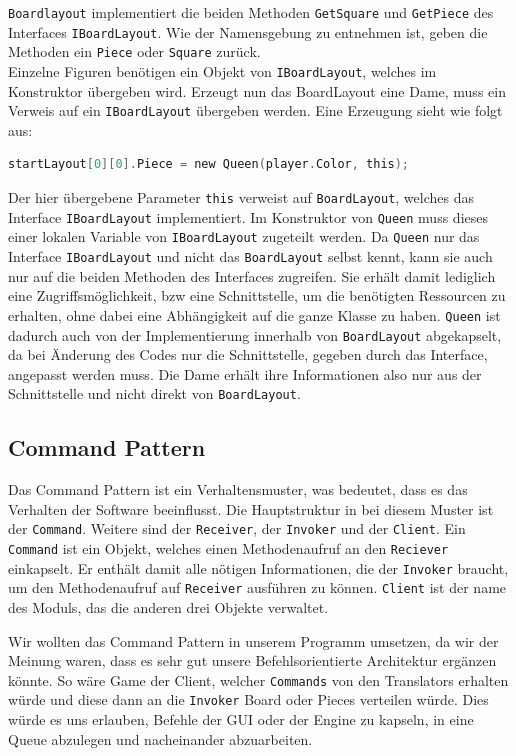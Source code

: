 \documentclass[
10pt, %
a4paper, %
oneside, %
headinclude,footinclude, %
BCOR5mm, %
]{scrartcl}
\begin{document}
\begin{onehalfspace}
\texttt{Boardlayout} implementiert die beiden Methoden \texttt{GetSquare} und \texttt{GetPiece} des Interfaces \texttt{IBoardLayout}. Wie der Namensgebung zu entnehmen ist, geben die Methoden ein \texttt{Piece} oder \texttt{Square} zurück. \\
Einzelne Figuren benötigen ein Objekt von \texttt{IBoardLayout}, welches im Konstruktor übergeben wird. Erzeugt nun das BoardLayout eine Dame, muss ein Verweis auf ein \texttt{IBoardLayout} übergeben werden. Eine Erzeugung sieht wie folgt aus:

\begin{lstlisting}[language=c, style=mStyle]
startLayout[0][0].Piece = new Queen(player.Color, this);
\end{lstlisting}

Der hier übergebene Parameter \texttt{this} verweist auf \texttt{BoardLayout}, welches das Interface \texttt{IBoardLayout} implementiert. Im Konstruktor von \texttt{Queen} muss dieses einer lokalen Variable von \texttt{IBoardLayout} zugeteilt werden. Da \texttt{Queen} nur das Interface \texttt{IBoardLayout}
und nicht das \texttt{BoardLayout} selbst kennt, kann sie auch nur auf die beiden Methoden des Interfaces zugreifen. Sie erhält damit lediglich eine Zugriffsmöglichkeit, bzw eine Schnittstelle, um die benötigten Ressourcen zu erhalten, ohne dabei eine Abhängigkeit auf die ganze Klasse zu haben. \texttt{Queen} ist dadurch auch von der Implementierung innerhalb von \texttt{BoardLayout} abgekapselt, da bei Änderung des Codes nur die Schnittstelle, gegeben durch das Interface, angepasst werden muss. Die Dame erhält ihre Informationen also nur aus der Schnittstelle und nicht direkt von \texttt{BoardLayout}.
\subsection{Command Pattern}
Das Command Pattern ist ein Verhaltensmuster, was bedeutet, dass es das Verhalten der Software beeinflusst. Die Hauptstruktur in bei diesem Muster ist der \texttt{Command}. Weitere sind der \texttt{Receiver}, der \texttt{Invoker} und der \texttt{Client}. Ein \texttt{Command} ist ein Objekt, welches einen Methodenaufruf an den \texttt{Reciever} einkapselt. Er enthält damit alle nötigen Informationen, die der \texttt{Invoker} braucht, um den Methodenaufruf auf \texttt{Receiver} ausführen zu können. \texttt{Client} ist der name des Moduls, das die anderen drei Objekte verwaltet.

Wir wollten das Command Pattern in unserem Programm umsetzen, da wir der Meinung waren, dass es sehr gut unsere Befehlsorientierte Architektur ergänzen könnte. So wäre Game der Client, welcher \texttt{Commands} von den Translators erhalten würde und diese dann an die \texttt{Invoker} Board oder Pieces verteilen würde.
Dies würde es uns erlauben, Befehle der GUI oder der Engine zu kapseln, in eine Queue abzulegen und nacheinander abzuarbeiten.


\end{onehalfspace}
\end{document}
